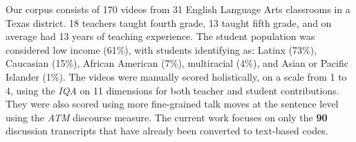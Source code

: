 \documentclass[runningheads]{llncs}
\begin{document}
Our corpus consists of 170 videos
from 31 %
English Language Arts classrooms in a Texas district. %
18 teachers taught fourth grade,  13 taught fifth grade, and on average had 13 years of teaching experience. 
The %
student population 
was considered low income (61\%), with %
students identifying as: Latinx (73\%), Caucasian (15\%), African American (7\%), multiracial (4\%), and Asian or Pacific Islander (1\%).
The 
videos were  manually scored holistically, on a scale from 1 to 4, using the \textit{IQA}  on 11 
dimensions 
for both teacher and student contributions. They were also scored using more fine-grained talk moves at the sentence level using the \textit{ATM} 
discourse measure.
The current work 
focuses on only the \textbf{90} discussion transcripts that have already been converted to text-based codes. 
\end{document}
